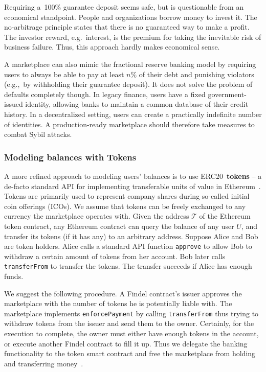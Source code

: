 Requiring a~100\% guarantee deposit seems safe, but is questionable from an economical standpoint.
People and organizations borrow money to invest it.
The no-arbitrage principle states that there is no guaranteed way to make a profit.
The investor reward, e.g.~interest, is the premium for taking the inevitable risk of business failure.
Thus, this approach hardly makes economical sense.

A marketplace can also mimic the fractional reserve banking model by requiring users to always be able to pay at least $n$\% of their debt and punishing violators (e.g.,~by withholding their guarantee deposit).
It does not solve the problem of defaults completely though.
In legacy finance, users have a fixed government-issued identity, allowing banks to maintain a common database of their credit history.
In a decentralized setting, users can create a practically indefinite number of identities.
A production-ready marketplace should therefore take measures to combat Sybil attacks.


\subsubsection{Modeling balances with Tokens}

A more refined approach to modeling users' balances is to use ERC20~\textbf{tokens} -- a de-facto standard API for implementing transferable units of value in Ethereum~\cite{Victor2019}.
Tokens are primarily used to represent company shares during so-called initial coin offerings (ICOs).
We assume that tokens can be freely exchanged to any currency the marketplace operates with.
Given the address $\mathcal{T}$ of the Ethereum token contract, any Ethereum contract can query the balance of any user $U$, and transfer its tokens (if it has any) to an arbitrary address.
Suppose Alice and Bob are token holders.
Alice calls a standard API function \texttt{approve} to allow Bob to withdraw a certain amount of tokens from her account.
Bob later calls \texttt{transferFrom} to transfer the tokens.
The transfer succeeds if Alice has enough funds.

We suggest the following procedure.
A Findel contract's issuer approves the marketplace with the number of tokens he is potentially liable with.
The marketplace implements \texttt{enforcePayment} by calling \texttt{transferFrom} thus trying to withdraw tokens from the issuer and send them to the owner.
Certainly, for the execution to complete, the owner must either have enough tokens in the account, or execute another Findel contract to fill it up.
Thus we delegate the banking functionality to the token smart contract and free the marketplace from holding and transferring money~\cite{Khovratovich2016}.


